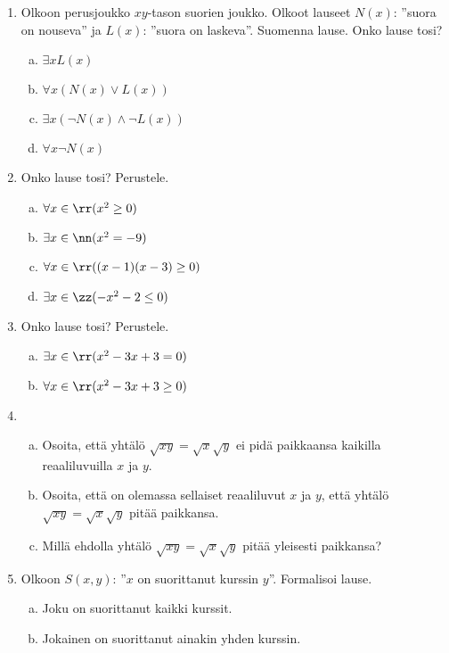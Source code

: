 \begin{kotitehtavasivu}

\begin{enumerate}%
\item Olkoon perusjoukko $xy$-tason suorien joukko. Olkoot
lauseet $N(x)$: ''suora on nouseva'' ja $L(x)$: ''suora on laskeva''.
Suomenna lause. Onko lause tosi?
\begin{enumerate}[a)]
\item $\exists x L(x)$
\item $\forall x (N(x) \lor L(x))$
\item $\exists x (\lnot N(x) \land \lnot L(x))$
\item $\forall x \lnot N(x)$
\end{enumerate}%
\item Onko lause tosi? Perustele.
\begin{enumerate}[a)]
\item $\forall x\in\rr (x^2 \ge 0)$
\item $\exists x\in\nn (x^2 = -9)$
\item $\forall x\in\rr ((x-1)(x-3) \ge 0)$
\item $\exists x\in\zz (-x^2 - 2 \le 0)$
\end{enumerate}%
\item Onko lause tosi? Perustele.
\begin{enumerate}[a)]
\item $\exists x\in \rr (x^2 - 3x + 3 = 0)$
\item $\forall x\in \rr (x^2 - 3x + 3 \ge 0)$
\end{enumerate}%
\item
\begin{enumerate}[a)]
\item Osoita, että yhtälö $\sqrt{xy} = \sqrt{x}\sqrt{y}$ ei
pidä paikkaansa kaikilla reaaliluvuilla $x$ ja $y$.
\item Osoita, että on olemassa sellaiset reaaliluvut $x$ ja
$y$, että yhtälö $\sqrt{xy} = \sqrt{x}\sqrt{y}$ pitää paikkansa.
\item Millä ehdolla yhtälö $\sqrt{xy} = \sqrt{x}\sqrt{y}$
pitää yleisesti paikkansa?
\end{enumerate}%
\item Olkoon $S(x, y)$: ''$x$ on suorittanut kurssin $y$''.
Formalisoi lause.
\begin{enumerate}[a)]
\item Joku on suorittanut kaikki kurssit.
\item Jokainen on suorittanut ainakin yhden kurssin.

\end{enumerate}
\end{enumerate}
\end{kotitehtavasivu}
